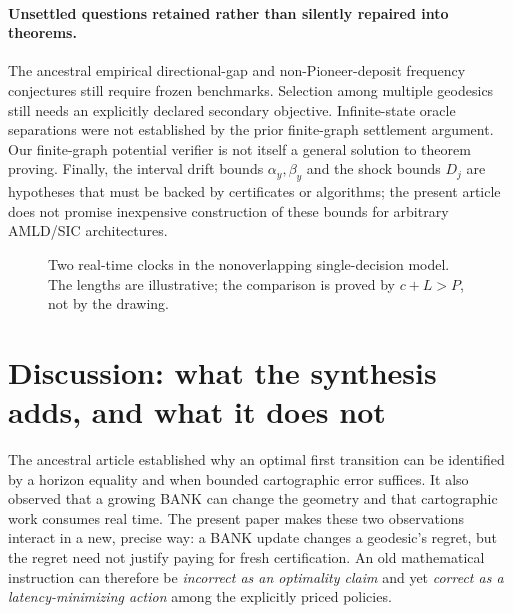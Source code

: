 \documentclass[11pt]{article}
\theoremstyle{definition}\newtheorem{definition}[theorem]{Definition}\newtheorem{assumption}[theorem]{Assumption}
\theoremstyle{remark}\newtheorem{remark}[theorem]{Remark}
\begin{document}
\paragraph{Unsettled questions retained rather than silently repaired into theorems.}
The ancestral empirical directional-gap and non-Pioneer-deposit frequency conjectures still require frozen benchmarks. Selection among multiple geodesics still needs an explicitly declared secondary objective. Infinite-state oracle separations were not established by the prior finite-graph settlement argument. Our finite-graph potential verifier is not itself a general solution to theorem proving. Finally, the interval drift bounds $\alpha_y,\beta_y$ and the shock bounds $D_j$ are hypotheses that must be backed by certificates or algorithms; the present article does not promise inexpensive construction of these bounds for arbitrary AMLD/SIC architectures.

\begin{figure}[htbp]\centering
{}
\caption{Two real-time clocks in the nonoverlapping single-decision model. The lengths are illustrative; the comparison is proved by $c+L>P$, not by the drawing.}\label{fig:clocks}
\end{figure}

\section{Discussion: what the synthesis adds, and what it does not}
The ancestral article established why an optimal first transition can be identified by a horizon equality and when bounded cartographic error suffices. It also observed that a growing BANK can change the geometry and that cartographic work consumes real time. The present paper makes these two observations interact in a new, precise way: a BANK update changes a geodesic's regret, but the regret need not justify paying for fresh certification. An old mathematical instruction can therefore be \emph{incorrect as an optimality claim} and yet \emph{correct as a latency-minimizing action} among the explicitly priced policies.
\end{document}
